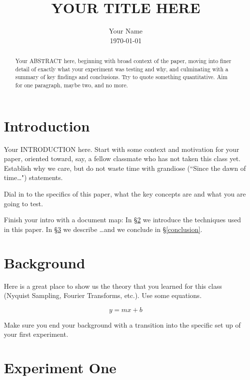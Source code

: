 \documentclass[12pt,preprint]{aastex}
\begin{document}
\title{YOUR TITLE HERE}

\author{Your Name \\ \today}

\begin{abstract}
Your ABSTRACT here, beginning with broad context of the paper,
moving into finer detail of exactly what your experiment was
testing and why, and culminating with a summary of key findings
and conclusions. Try to quote something quantitative. Aim for
one paragraph, maybe two, and no more.
\end{abstract}


\section{Introduction}
\label{intro} %

Your INTRODUCTION here. Start with some context and motivation for
your paper, oriented toward, say, a fellow classmate who has not
taken this class yet. Establish why we care, but do not waste time
with grandiose (``Since the dawn of time\dots") statements.

Dial in to the specifics of this paper, what the key concepts are
and what you are going to test.

Finish your intro with a document map: In \S\ref{background} we 
introduce the techniques used in this paper. In \S\ref{experiment1}
we describe \dots and we conclude in 
\S\ref{conclusion}.

\section{Background}
\label{background}

Here is a great place to show us the theory that you learned for
this class (Nyquist Sampling, Fourier Transforms, etc.). Use some
equations.

\begin{equation}
y=mx+b
\label{eq:example}
\end{equation}

Make sure you end your background with a transition into the specific
set up of your first experiment.

\section{Experiment One}
\label{experiment1}
\end{document}

